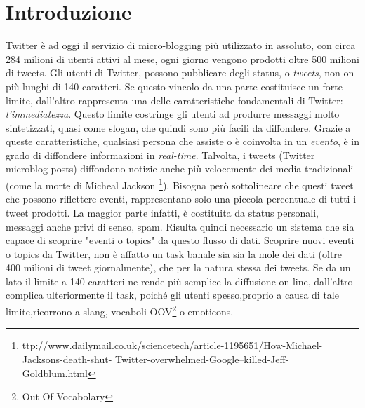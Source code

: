 
\cleardoublepage
\chapter*{Introduzione}
Twitter è ad oggi il servizio di micro-blogging più utilizzato in assoluto, con circa 284 milioni di utenti attivi al mese, ogni giorno vengono prodotti oltre 500 milioni di tweets. Gli utenti di Twitter, possono pubblicare degli status, o \emph{tweets}, non on più lunghi di 140 caratteri. Se questo vincolo da una parte costituisce un forte limite, dall'altro rappresenta una delle caratteristiche fondamentali di Twitter: \emph{l'immediatezza}. Questo limite costringe gli utenti ad produrre messaggi molto sintetizzati, quasi come slogan, che quindi sono più facili da diffondere. Grazie a queste caratteristiche, qualsiasi persona che assiste o è coinvolta in un \emph{evento}, è in grado di diffondere informazioni in \emph{real-time}.
Talvolta, i tweets (Twitter microblog posts) diffondono notizie anche più velocemente dei media tradizionali (come la morte di Micheal Jackson \footnote{ttp://www.dailymail.co.uk/sciencetech/article-1195651/How-Michael-Jacksons-death-shut-
Twitter-overwhelmed-Google–killed-Jeff-Goldblum.html}).
Bisogna però sottolineare che questi tweet che possono riflettere eventi, rappresentano solo una piccola percentuale di tutti i tweet prodotti. La maggior parte infatti, è costituita da status personali, messaggi anche privi di senso, spam. Risulta quindi necessario un sistema che sia capace di scoprire "eventi o topics" da questo flusso di dati. Scoprire nuovi eventi o topics da Twitter, non è affatto un task banale sia 
sia la mole dei dati (oltre 400 milioni di tweet giornalmente), che per la natura stessa dei tweets. Se da un lato il limite a 140 caratteri ne rende più semplice la diffusione on-line, dall'altro complica ulteriormente il task, poiché gli utenti spesso,proprio a causa di tale limite,ricorrono a slang, vocaboli OOV\footnote{Out Of Vocabolary} o emoticons.
